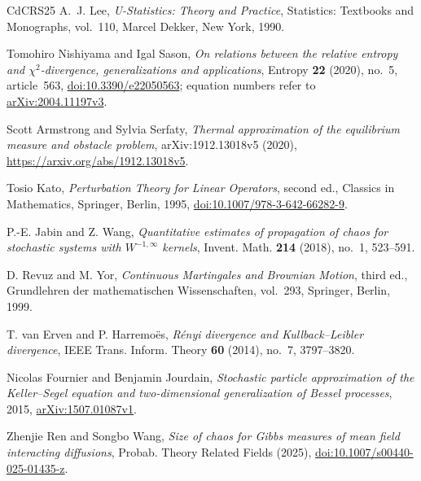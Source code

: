 \documentclass[11pt,reqno]{amsart}
\numberwithin{equation}{section}
\theoremstyle{plain}
\theoremstyle{remark}
\begin{document}
\begin{thebibliography}{CdCRS25}
\begingroup
{}
A.~J. Lee, \emph{U-Statistics: Theory and Practice}, Statistics: Textbooks and Monographs, vol.~110, Marcel Dekker, New York, 1990.

Tomohiro Nishiyama and Igal Sason, \emph{On relations between the relative entropy and $\chi^2$-divergence, generalizations and applications}, Entropy \textbf{22} (2020), no.~5, article~563, \href{https://doi.org/10.3390/e22050563}{doi:10.3390/e22050563}; equation numbers refer to \href{https://arxiv.org/abs/2004.11197v3}{arXiv:2004.11197v3}.
\par\endgroup


\begingroup
{}
Scott Armstrong and Sylvia Serfaty, \emph{Thermal approximation of the equilibrium measure and obstacle problem}, arXiv:1912.13018v5 (2020), \url{https://arxiv.org/abs/1912.13018v5}.

Tosio Kato, \emph{Perturbation Theory for Linear Operators}, second ed., Classics in Mathematics, Springer, Berlin, 1995, \href{https://doi.org/10.1007/978-3-642-66282-9}{doi:10.1007/978-3-642-66282-9}.
\par\endgroup

P.-E. Jabin and Z. Wang,
\emph{Quantitative estimates of propagation of chaos for stochastic systems with $W^{-1,\infty}$ kernels},
Invent. Math. \textbf{214} (2018), no.~1, 523--591.

D. Revuz and M. Yor,
\emph{Continuous Martingales and Brownian Motion}, third ed.,
Grundlehren der mathematischen Wissenschaften, vol.~293, Springer, Berlin, 1999.

T. van Erven and P. Harremo\"es,
\emph{R\'enyi divergence and Kullback--Leibler divergence},
IEEE Trans. Inform. Theory \textbf{60} (2014), no.~7, 3797--3820.


Nicolas Fournier and Benjamin Jourdain, \emph{Stochastic particle approximation
of the {K}eller--{S}egel equation and two-dimensional generalization of
{B}essel processes}, 2015,
\href{https://arxiv.org/abs/1507.01087v1}{arXiv:1507.01087v1}.

Zhenjie Ren and Songbo Wang, \emph{Size of chaos for Gibbs measures of mean field interacting diffusions}, Probab. Theory Related Fields (2025),
\href{https://doi.org/10.1007/s00440-025-01435-z}{doi:10.1007/s00440-025-01435-z}.


\end{thebibliography}
\end{document}
